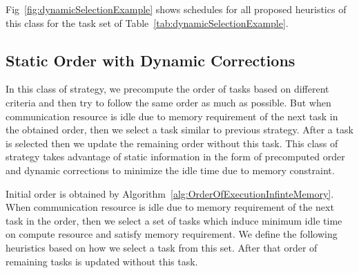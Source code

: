 \documentclass[sigconf]{acmart}
\begin{document}
	
	Fig~\ref{fig:dynamicSelectionExample} shows schedules for all proposed heuristics of this class for the task set of Table~\ref{tab:dynamicSelectionExample}.
	
	\subsection{Static Order with Dynamic Corrections}
	
	In this class of strategy, we precompute the order of tasks based on different criteria and then try to follow the same order as much as possible. But when communication resource is idle due to memory requirement of the next task in the obtained order, then we select a task similar to previous strategy. After a task is selected then we update the remaining order without this task. This class of strategy takes advantage of static information in the form of precomputed order and dynamic corrections to minimize the idle time due to memory constraint.
	
	Initial order is obtained by Algorithm~\ref{alg:OrderOfExecutionInfinteMemory}. When communication resource is idle due to memory requirement of the next task in the order, then we select a set of tasks which induce minimum idle time on compute resource and satisfy memory requirement. We define the following heuristics based on how we select a task from this set. After that order of remaining tasks is updated without this task.
	
\end{document}
